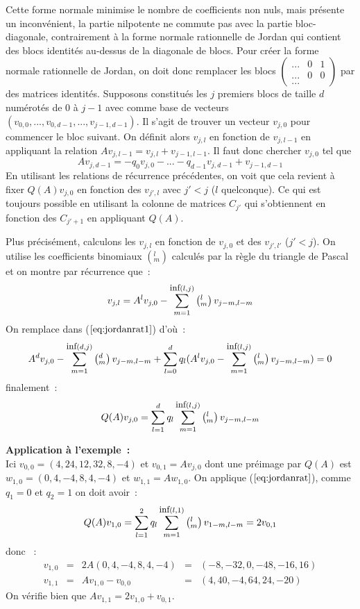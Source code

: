 \documentclass[a4paper,11pt]{book}
\begin{document}
\begin{giacjshere}
Cette forme normale minimise le nombre de coefficients non nuls,
mais présente un inconvénient, la partie nilpotente ne commute pas
avec la partie bloc-diagonale, contrairement à la forme normale
rationnelle de Jordan qui contient des blocs identités au-dessus
de la diagonale de blocs.
Pour créer la forme normale rationnelle de Jordan, on doit donc remplacer
les blocs $\left( \begin{array}{ccc} ... & 0 & 1 \\ ... & 0 & 0 
\\ ... \end{array} \right)$
par des matrices identit\'es. Supposons constitués les $j$ premiers blocs de
taille $d$ numérotés de 0 à $j-1$ avec comme base de vecteurs
$(v_{0,0},...,v_{0,d-1},...,v_{j-1,d-1})$. 
Il s'agit de trouver un vecteur $v_{j,0}$ pour commencer le bloc
suivant. On définit alors $v_{j,l}$ en fonction de $v_{j,l-1}$
en appliquant la relation $Av_{j,l-1}=v_{j,l}+v_{j-1,l-1}$.
Il faut donc chercher $v_{j,0}$ tel que 
\begin{equation} \label{eq:jordanrat1}
 Av_{j,d-1}=-q_0 v_{j,0}-...-q_{d-1} v_{j,d-1}+v_{j-1,d-1} 
\end{equation}
En utilisant les relations de récurrence précédentes, on voit que
cela revient à fixer $Q(A)v_{j,0}$ en fonction des $v_{j',l}$ avec
$j'<j$ ($l$ quelconque). Ce qui est toujours possible en utilisant
la colonne de matrices $C_{j'}$ qui s'obtiennent en
fonction des $C_{j'+1}$ en appliquant $Q(A)$.

Plus pr\'ecis\'ement, calculons les $v_{j,l}$ en fonction de $v_{j,0}$
et des $v_{j',l'}$ ($j'<j$). On utilise les coefficients binomiaux 
$\left( ^l_m\right)$ calcul\'es par la r\`egle du triangle de Pascal et
on montre par r\'ecurrence que~:
\begin{equation} \label{eq:jordanrat3}
v_{j,l} = A^l v_{j,0} - \sum_{m=1}^{\mbox{\small inf}(l,j)} 
\left( ^l _m\right) v_{j-m,l-m}
\end{equation}
On remplace dans (\(\ref{eq:jordanrat1}\)) d'o\`u~:
\[ A^d v_{j,0} - \sum_{m=1}^{\mbox{\small inf}(d,j)} 
\left( ^d _m\right)v_{j-m,l-m}
+ \sum_{l=0}^d 
q_l (A^l v_{j,0} - \sum_{m=1}^{\mbox{\small inf}(l,j)} \left( ^l _m\right) 
v_{j-m,l-m} )=0
\]
finalement~:
\begin{equation} \label{eq:jordanrat}
 Q(A) v_{j,0}= \sum_{l=1}^d 
q_l \sum_{m=1}^{\mbox{\small inf}(l,j)} \left( ^l _m\right) v_{j-m,l-m} 
\end{equation}

{\bf Application \`a l'exemple~:}\\
Ici $v_{0,0}=(4,24,12,32,8,-4)$ et $v_{0,1}=Av_{j,0}$ dont une pr\'eimage
par $Q(A)$ est $w_{1,0}=(0,4,-4,8,4,-4)$ et $w_{1,1}=Aw_{1,0}$.
On applique (\(\ref{eq:jordanrat}\)), comme $q_1=0$ et $q_2=1$
on doit avoir~:
\[ Q(A) v_{1,0} = \sum_{l=1}^2
q_l \sum_{m=1}^{\mbox{\small inf}(l,1)} \left( ^l _m\right) v_{1-m,l-m} 
 =2v_{0,1} \]
donc ~:
\[\begin{array}{ccccc}
 v_{1,0}&=&2A(0,4,-4,8,4,-4)&=&(-8,-32,0,-48,-16,16) \\
 v_{1,1}&=&Av_{1,0}-v_{0,0}&=&(4,40,-4,64,24,-20) 
\end{array}
\]
On v\'erifie bien que $Av_{1,1}=2v_{1,0}+v_{0,1}$.


\end{giacjshere}
\end{document}
